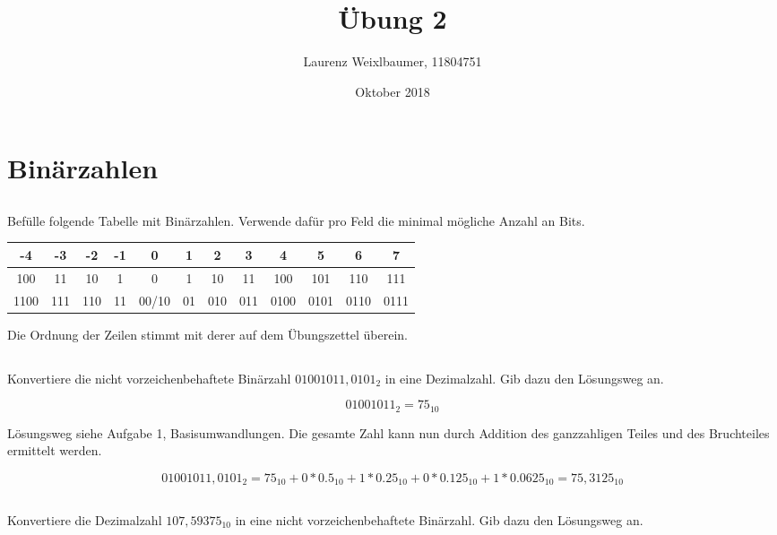\documentclass{article}
\title{Übung 2}
\author{Laurenz Weixlbaumer, 11804751}
\date{Oktober 2018}
\begin{document}
\maketitle

\section{Binärzahlen}

\subsection{}
Befülle folgende Tabelle mit Binärzahlen. Verwende dafür pro Feld die minimal mögliche Anzahl an Bits.

\begin{center}
\begin{tabular}{ c | c | c | c | c | c | c | c | c | c | c | c }
    -4 & -3 & -2 & -1 & 0 & 1 & 2 & 3 & 4 & 5 & 6 & 7\\
    \hline
    100 & 11 & 10 & 1 & 0 & 1 & 10 & 11 & 100 & 101 & 110 & 111\\
    \hline
    1100 & 111 & 110 & 11 & 00/10 & 01 & 010 & 011 & 0100 & 0101 & 0110 & 0111\\
\end{tabular}
\end{center}

Die Ordnung der Zeilen stimmt mit derer auf dem Übungszettel überein.

\subsection{}
Konvertiere die nicht vorzeichenbehaftete Binärzahl $01001011, 0101_2$ in eine Dezimalzahl. Gib dazu den Lösungsweg an.

$$01001011_{2} = 75_{10}$$

Lösungsweg siehe Aufgabe 1, Basisumwandlungen. Die gesamte Zahl kann nun durch Addition des ganzzahligen Teiles und des Bruchteiles ermittelt werden.

$$01001011, 0101_2 = 75_{10} + 0 * 0.5_{10} + 1 * 0.25_{10} + 0 * 0.125_{10} + 1 * 0.0625_{10} = 75, 3125_{10}$$

\clearpage

\subsection{}

Konvertiere die Dezimalzahl $107, 59375_{10}$ in eine nicht vorzeichenbehaftete Binärzahl. Gib dazu den Lösungsweg an.
\end{document}
